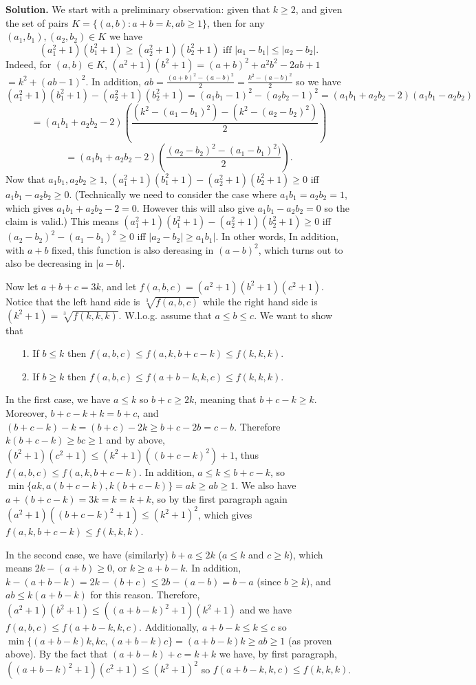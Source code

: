 \documentclass[11pt,a4paper]{article}
\begin{document}
\begin{itemize}
\textbf{Solution.} 
We start with a preliminary observation: 
given that $k\ge 2$, and given the set of pairs $K=\{(a,b): a+b=k, ab\ge 1\}$, 
then for any $(a_1,b_1), (a_2, b_2)\in K$ we have
\[(a_1^2+1)(b_1^2+1)\ge (a_2^2+1)(b_2^2+1) \text{ iff } |a_1-b_1|\le |a_2-b_2|.\] 
Indeed, for $(a,b)\in K$, $(a^2+1)(b^2+1)=(a+b)^2+a^2b^2-2ab+1$
$=k^2+(ab-1)^2$. 
In addition, $ab=\frac{(a+b)^2-(a-b)^2}{2}=\frac{k^2-(a-b)^2}{2}$
so we have 
\[(a_1^2+1)(b_1^2+1)-(a_2^2+1)(b_2^2+1)
=(a_1b_1-1)^2-(a_2b_2-1)^2
=(a_1b_1+a_2b_2-2)(a_1b_1-a_2b_2)\]
\[=(a_1b_1+a_2b_2-2)\left(\frac{(k^2-(a_1-b_1)^2)-(k^2-(a_2-b_2)^2)}{2}\right)\]
\[=(a_1b_1+a_2b_2-2)\left(\frac{(a_2-b_2)^2-(a_1-b_1)^2)}{2}\right).\]
Now that $a_1b_1, a_2b_2\ge 1$, 
$(a_1^2+1)(b_1^2+1)-(a_2^2+1)(b_2^2+1)\ge 0$ iff 
$a_1b_1-a_2b_2\ge 0$. 
(Technically we need to consider the case where $a_1b_1=a_2b_2=1$, which gives $a_1b_1+a_2b_2-2=0$. 
However this will also give $a_1b_1-a_2b_2=0$ so the claim is valid.)
This means $(a_1^2+1)(b_1^2+1)-(a_2^2+1)(b_2^2+1)\ge 0$ iff $(a_2-b_2)^2-(a_1-b_1)^2\ge 0$ 
iff $|a_2-b_2|\ge a_1b_1|$. 
In other words, 
In addition, with $a+b$ fixed, this function is also dereasing in $(a-b)^2$, which turns out to also be decreasing in $|a-b|$. 

Now let $a+b+c=3k$, and let $f(a,b,c)=(a^2+1)(b^2+1)(c^2+1)$. 
Notice that the left hand side is $\sqrt[3]{f(a,b,c)}$ while the right hand side is $(k^2+1)=\sqrt[3]{f(k,k,k)}$. 
W.l.o.g. assume that $a\le b\le c$. We want to show that 
\begin{itemize}
\item [1.] If $b\le k$ then $f(a,b,c)\le f(a, k, b+c-k)\le f(k, k, k)$. 
\item [2.] If $b\ge k$ then $f(a,b,c)\le f(a+b-k, k, c)\le f(k,k,k)$. 
\end{itemize}

In the first case, we have $a\le k$ so $b+c\ge 2k$, meaning that 
$b+c-k\ge k$. 
Moreover, $b+c-k+k=b+c$, and $(b+c-k)-k=(b+c)-2k\ge b+c-2b=c-b$. 
Therefore $k(b+c-k)\ge bc\ge 1$ and by above, $(b^2+1)(c^2+1)\le (k^2+1)((b+c-k)^2)+1$, thus 
$f(a,b,c)\le f(a, k, b+c-k)$. 
In addition, $a\le k\le b+c-k$, so $\min\{ak, a(b+c-k), k(b+c-k)\}=ak\ge ab\ge 1$. 
We also have $a+(b+c-k)=3k=k=k+k$, 
so by the first paragraph again 
$(a^2+1)((b+c-k)^2+1)\le (k^2+1)^2$, 
which gives 
$f(a, k, b+c-k)\le f(k, k, k)$. 

In the second case, we have (similarly)
$b+a\le 2k$ ($a\le k$ and $c\ge k$), which means $2k-(a+b)\ge 0$, or $k\ge a+b-k$. In addition, 
$k-(a+b-k)=2k-(b+c)\le 2b-(a-b)=b-a$ (since $b\ge k$), 
and 
$ab\le k(a+b-k)$ for this reason. 
Therefore, 
$(a^2+1)(b^2+1)\le ((a+b-k)^2+1)(k^2+1)$ 
and we have $f(a,b,c)\le f(a+b-k, k, c)$. 
Additionally, $a+b-k\le k\le c$ so
$\min\{(a+b-k)k, kc, (a+b-k)c\}=(a+b-k)k\ge ab\ge 1$ (as proven above). 
By the fact that $(a+b-k)+c=k+k$ we have, by first paragraph, 
$((a+b-k)^2+1)(c^2+1)\le (k^2+1)^2$ so 
$f(a+b-k, k, c)\le f(k,k,k)$. 


\end{itemize}
\end{document}
